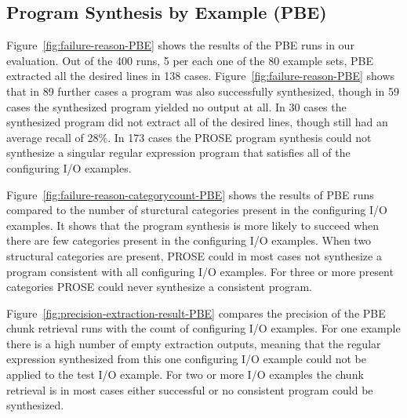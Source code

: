 \documentclass[\myrootdir/main.tex]{subfiles}
\begin{document}
\subsection{Program Synthesis by Example (PBE)}
Figure~\ref{fig:failure-reason-PBE} shows the results of the PBE runs in our evaluation.
Out of the 400 runs, 5 per each one of the 80 example sets, PBE extracted all the desired lines in 138 cases.
Figure~\ref{fig:failure-reason-PBE} shows that in 89 further cases a program was also successfully synthesized, though in 59 cases the synthesized program yielded no output at all.
In 30 cases the synthesized program did not extract all of the desired lines, though still had an average recall of 28\%.
In 173 cases the PROSE program synthesis could not synthesize a singular regular expression program that satisfies all of the configuring I/O examples.

Figure~\ref{fig:failure-reason-categorycount-PBE} shows the results of PBE runs compared to the number of sturctural categories present in the configuring I/O examples.
It shows that the program synthesis is more likely to succeed when there are few categories present in the configuring I/O examples.
When two structural categories are present, PROSE could in most cases not synthesize a program consistent with all configuring I/O examples.
For three or more present categories PROSE could never synthesize a consistent program.

Figure~\ref{fig:precision-extraction-result-PBE} compares the precision of the PBE chunk retrieval runs with the count of configuring I/O examples.
For one example there is a high number of empty extraction outputs, meaning that the regular expression synthesized from this one configuring I/O example could not be applied to the test I/O example.
For two or more I/O examples the chunk retrieval is in most cases either successful or no consistent program could be synthesized.
\end{document}
